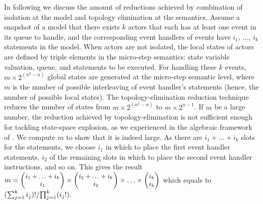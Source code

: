 In following we discuss the amount of reductions achieved by combination of isolation at the model and topology elimination at the semantics. Assume a snapshot of a model that there exists $k$ actors that each has at least one event in its queue to handle, and the corresponding event handlers of events have $i_1$, $\ldots$, $i_k$ statements in the model. When actors are not isolated, the local states of actors are defined by triple elements in the micro-step semantics: state variable valuation, queue, and statements to be executed. For handling these $k$ events, $m\times 2^{(n^2-n)}$ global states are generated at the micro-step semantic level, where $m$ is the number of possible interleaving of event handler's statements (hence, the number of possible local states). The topology-elimination reduction technique reduces the number of states from $m\times 2^{(n^2-n)}$ to $m\times2^{n-1}$. If $m$ be a large number, the reduction achieved by topology-elimination is not sufficient enough for tackling state-space explosion, as we experienced in the algebraic framework of \cite{FOAC}.  %
We compute $m$ to show that it is indeed large. As there are $i_1+\ldots+i_k$ slots for the statements, we choose $i_1$ in which to place the first event handler statements, $i_2$ of the remaining slots in which to place the second event handler instructions, and so on. This gives the result  ${\small m=\begin{pmatrix}
	i_1+\ldots+i_k\\
	i_1 \\
	\end{pmatrix}\times
	\begin{pmatrix}
	i_2+\ldots+i_k\\
	i_2 \\
	\end{pmatrix}\times	\ldots\times
	\begin{pmatrix}
	i_k\\
	i_k \\
	\end{pmatrix}}$ which equals to ${\small %
{(\sum_{j=1}^{k} i_j)!}/{\prod_{j=1}^{k}(i_j!)}.}$%
